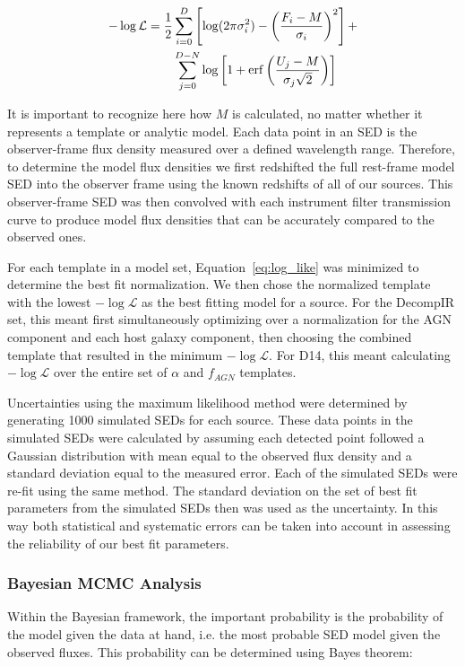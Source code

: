 \documentclass[fleqn, usenatbib]{mnras}
\begin{document}
\begin{align}\label{eq:log_like}
-\log\mathcal{L} = \frac{1}{2}&\sum_{i=0}^{D}\left[\log(2\pi\sigma_i^2) - \left(\frac{F_i - M}{\sigma_i}\right)^2\right] + \notag \\
&\sum_{j=0}^{D-N}\log\left[1 + \mathrm{erf}\left(\frac{U_j - M}{\sigma_j\sqrt{2}}\right)\right]
\end{align}

It is important to recognize here how $M$ is calculated, no matter whether it represents a template or analytic model. Each data point in an SED is the observer-frame flux density measured over a defined wavelength range. Therefore, to determine the model flux densities we first redshifted the full rest-frame model SED into the observer frame using the known redshifts of all of our sources. This observer-frame SED was then convolved with each instrument filter transmission curve to produce model flux densities that can be accurately compared to the observed ones.

For each template in a model set, Equation~\ref{eq:log_like} was minimized to determine the best fit normalization. We then chose the normalized template with the lowest $-\log\mathcal{L}$ as the best fitting model for a source. For the DecompIR set, this meant first simultaneously optimizing over a normalization for the AGN component and each host galaxy component, then choosing the combined template that resulted in the minimum $-\log\mathcal{L}$. For D14, this meant calculating $-\log\mathcal{L}$ over the entire set of $\alpha$ and $f_{AGN}$ templates.

Uncertainties using the maximum likelihood method were determined by generating 1000 simulated SEDs for each source. These data points in the simulated SEDs were calculated by assuming each detected point followed a Gaussian distribution with mean equal to the observed flux density and a standard deviation equal to the measured error. Each of the simulated SEDs were re-fit using the same method. The standard deviation on the set of best fit parameters from the simulated SEDs then was used as the uncertainty. In this way both statistical and systematic errors can be taken into account in assessing the reliability of our best fit parameters. 

\subsubsection{Bayesian MCMC Analysis}
Within the Bayesian framework, the important probability is the probability of the model given the data at hand, i.e. the most probable SED model given the observed fluxes. This probability can be determined using Bayes theorem:
\end{document}
